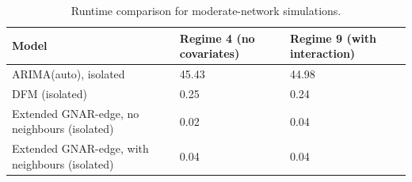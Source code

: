 \begin{table}
\caption{Runtime comparison for moderate-network simulations.}
\label{tab:sim_moderate_timing}
\begin{tabular}{lll}
\toprule
Model & Regime 4 (no covariates) & Regime 9 (with interaction) \\
\midrule
ARIMA(auto), isolated & 45.43 & 44.98 \\
DFM (isolated) & 0.25 & 0.24 \\
Extended GNAR-edge, no neighbours (isolated) & 0.02 & 0.04 \\
Extended GNAR-edge, with neighbours (isolated) & 0.04 & 0.04 \\
\bottomrule
\end{tabular}
\end{table}
